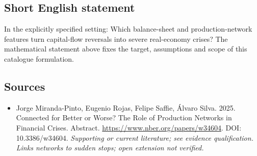 \documentclass[11pt]{article}
\begin{document}
\subsection{Short English statement}
In the explicitly specified setting: Which balance-sheet and production-network features turn capital-flow reversals into severe real-economy crises? The mathematical statement above fixes the target, assumptions and scope of this catalogue formulation.

\subsection{Sources}
\begin{itemize}\raggedright
\item[\textnormal{[S1]}]\hypertarget{source:30007618:1}{} Jorge Miranda-Pinto, Eugenio Rojas, Felipe Saffie, Álvaro Silva. 2025. Connected for Better or Worse? The Role of Production Networks in Financial Crises. Abstract.
\url{https://www.nber.org/papers/w34604}.
DOI: 10.3386/w34604.
{\small\textit{Supporting or current literature; see evidence qualification. Links networks to sudden stops; open extension not verified.}}
\end{itemize}
\end{document}
